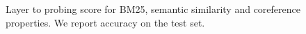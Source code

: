 \begin{figure}[!ht]
    \centering
    \begin{subfigure}{\textwidth}
        \centering
    \end{subfigure}

    \begin{subfigure}{\textwidth}
        \centering
    \end{subfigure}

    \begin{subfigure}{\textwidth}
        \centering
    \end{subfigure}

    \caption{Layer to probing score for BM25, semantic similarity and coreference properties. We report accuracy on the test set.}
    \label{fig:sem_sim_coref}
\end{figure}

